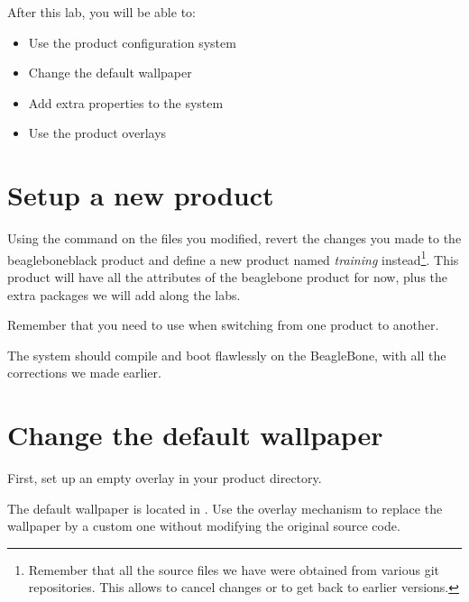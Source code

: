 
After this lab, you will be able to:
\begin{itemize}
  \item Use the product configuration system
  \item Change the default wallpaper
  \item Add extra properties to the system
  \item Use the product overlays
\end{itemize}

\section{Setup a new product}

Using the  command on the files you modified,
revert the changes you made to the beagleboneblack product and define
a new product named \textit{training} instead\footnote{Remember that
  all the source files we have were obtained from various git
  repositories. This allows to cancel changes or to get back to
  earlier versions.}.  This product will have all the attributes of
the beaglebone product for now, plus the extra packages we will add
along the labs.

Remember that you need to use  when switching
from one product to another.

The system should compile and boot flawlessly on the BeagleBone, with
all the corrections we made earlier.

\section{Change the default wallpaper}

First, set up an empty overlay in your product directory.

The default wallpaper is located in .
Use the overlay mechanism to replace the wallpaper by a custom one without
modifying the original source code.
